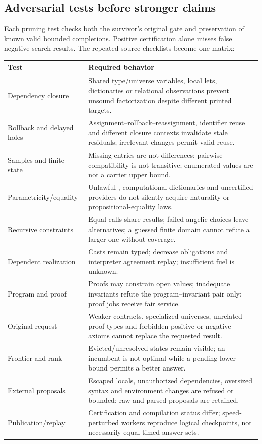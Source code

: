 \subsection{Adversarial tests before stronger claims}

Each pruning test checks both the survivor's original gate and preservation of
known valid bounded completions. Positive certification alone misses false
negative search results. The repeated source checklists become one matrix:

\begin{longtable}{@{}L{40mm}L{108mm}@{}}
\toprule Test & Required behavior\\\midrule\endhead
Dependency closure & Shared type/universe variables, local lets, dictionaries or relational observations prevent unsound factorization despite different printed targets.\\
Rollback and delayed holes & Assignment--rollback--reassignment, identifier reuse and different closure contexts invalidate stale residuals; irrelevant changes permit valid reuse.\\
Samples and finite state & Missing entries are not differences; pairwise compatibility is not transitive; enumerated values are not a carrier upper bound.\\
Parametricity/equality & Unlawful , computational dictionaries and uncertified providers do not silently acquire naturality or propositional-equality laws.\\
Recursive constraints & Equal calls share results; failed angelic choices leave alternatives; a guessed finite domain cannot refute a larger one without coverage.\\
Dependent realization & Casts remain typed; decrease obligations and interpreter agreement replay; insufficient fuel is unknown.\\
Program and proof & Proofs may constrain open values; inadequate invariants refute the program--invariant pair only; proof jobs receive fair service.\\
Original request & Weaker contracts, specialized universes, unrelated proof types and forbidden positive or negative axioms cannot replace the requested result.\\
Frontier and rank & Evicted/unresolved states remain visible; an incumbent is not optimal while a pending lower bound permits a better answer.\\
External proposals & Escaped locals, unauthorized dependencies, oversized syntax and environment changes are refused or bounded; raw and parsed proposals are retained.\\
Publication/replay & Certification and compilation status differ; speed-perturbed workers reproduce logical checkpoints, not necessarily equal timed answer sets.\\
\bottomrule
\end{longtable}

